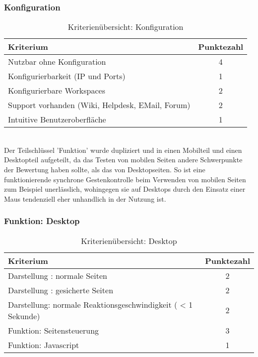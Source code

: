 \subsubsection{Konfiguration}
\begin{table}[H]
 	\vspace{-30pt}
 	\centering
		\begin{tabular}{| p{12cm} | c|}
			\hline
				Kriterium		 &	Punktezahl\\
			\hline
			\hline
				Nutzbar ohne Konfiguration			&4\\
				Konfigurierbarkeit (IP und Ports)			&	1	\\
				Konfigurierbare \Gls{Workspace}s			&	2	\\
				Support vorhanden (Wiki, Helpdesk, EMail, Forum)				&	2	\\
				Intuitive Benutzeroberfläche			&	1	\\
				\hline
		\end{tabular}
	\caption{Kriterienübersicht: Konfiguration}
\end{table}

\\Der Teilschlüssel 'Funktion' wurde dupliziert und in einen Mobilteil und einen Desktopteil aufgeteilt, da das Testen von mobilen Seiten \mbox{andere} Schwerpunkte der Bewertung haben sollte, als das von \mbox{Desktopseiten}. So ist eine funktionierende synchrone Gestenkontrolle beim Verwenden von mobilen Seiten zum Beispiel unerlässlich, wohingegen sie auf Desktops durch den Einsatz einer Maus tendenziell eher unhandlich in der Nutzung ist.
\subsubsection{Funktion: Desktop}
\begin{table}[H]
 	\vspace{-30pt}
 	\centering
		\begin{tabular}{| p{12cm} | c|}
			\hline
				Kriterium		 &	Punktezahl\\
			\hline
			\hline
				Darstellung : normale Seiten			&2\\
				Darstellung : \gls{gesichert}e Seiten		&	2	\\
				 Darstellung: normale Reaktionsgeschwindigkeit ( < 1 Sekunde)	&	2	\\
				Funktion: Seitensteuerung			&	3	\\
				Funktion: \Gls{Javascript}			&	1	\\
				\hline
		\end{tabular}
	\caption{Kriterienübersicht: Desktop}
\end{table}

